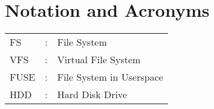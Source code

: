 \chapter*{Notation and Acronyms}
\vspace{1cm}

\noindent
\begin{tabular}{lcl}
    FS &: & File System \\
    VFS &: & Virtual File System \\
    FUSE &: & File System in Userspace \\
    HDD &: & Hard Disk Drive \\
\end{tabular}
